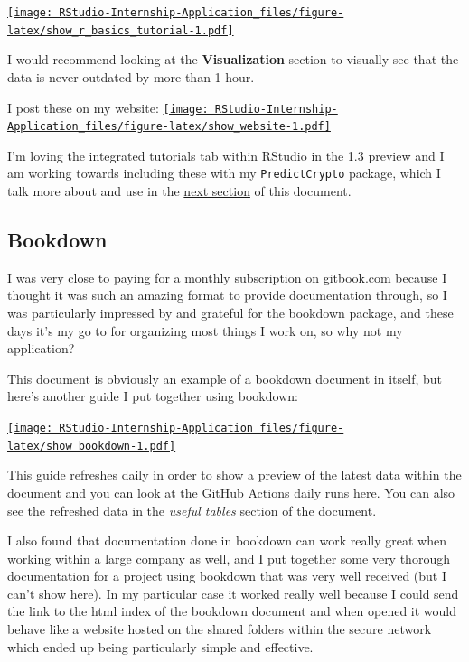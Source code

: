 \documentclass[
]{book}
\begin{document}
\href{https://predictcrypto.shinyapps.io/R_Basics/}{\texttt{[image: RStudio-Internship-Application\_files/figure-latex/show\_r\_basics\_tutorial-1.pdf]}}

I would recommend looking at the \textbf{Visualization} section to visually see that the data is never outdated by more than 1 hour.

I post these on my website:
\href{https://predictcrypto.com/tutorials}{\texttt{[image: RStudio-Internship-Application\_files/figure-latex/show\_website-1.pdf]}}

I'm loving the integrated tutorials tab within RStudio in the 1.3 preview and I am working towards including these with my \texttt{PredictCrypto} package, which I talk more about and use in the \protect\hyperlink{ideal-projects}{next section} of this document.

\hypertarget{bookdown}{%
\subsection{Bookdown}\label{bookdown}}

I was very close to paying for a monthly subscription on gitbook.com because I thought it was such an amazing format to provide documentation through, so I was particularly impressed by and grateful for the bookdown \citep{R-bookdown} package, and these days it's my go to for organizing most things I work on, so why not my application?

This document is obviously an example of a bookdown document in itself, but here's another guide I put together using bookdown:

\href{https://predictcryptodb-quickstart.com/}{\texttt{[image: RStudio-Internship-Application\_files/figure-latex/show\_bookdown-1.pdf]}}

This guide refreshes daily in order to show a preview of the latest data within the document \href{https://github.com/ries9112/PredictCryptoDB/actions}{and you can look at the GitHub Actions daily runs here}. You can also see the refreshed data in the \href{https://predictcryptodb-quickstart.com/useful-tables.html}{\emph{useful tables} section} of the document.

I also found that documentation done in bookdown can work really great when working within a large company as well, and I put together some very thorough documentation for a project using bookdown that was very well received (but I can't show here). In my particular case it worked really well because I could send the link to the html index of the bookdown document and when opened it would behave like a website hosted on the shared folders within the secure network which ended up being particularly simple and effective.
\end{document}
